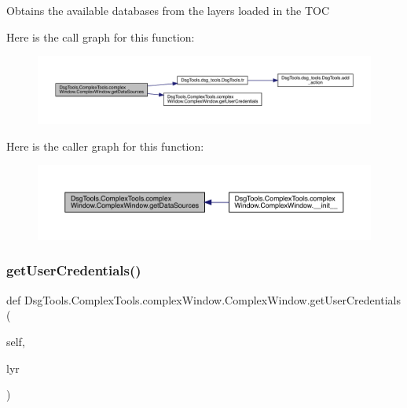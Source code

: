 \begin{DoxyVerb}Obtains the available databases from the layers loaded in the TOC
\end{DoxyVerb}
 Here is the call graph for this function\+:
\nopagebreak
\begin{figure}[H]
\begin{center}
\leavevmode
\includegraphics[width=350pt]{class_dsg_tools_1_1_complex_tools_1_1complex_window_1_1_complex_window_a4342f9df9ceb2b074509474ce8fa32d0_cgraph}
\end{center}
\end{figure}
Here is the caller graph for this function\+:
\nopagebreak
\begin{figure}[H]
\begin{center}
\leavevmode
\includegraphics[width=350pt]{class_dsg_tools_1_1_complex_tools_1_1complex_window_1_1_complex_window_a4342f9df9ceb2b074509474ce8fa32d0_icgraph}
\end{center}
\end{figure}
\mbox{\label{class_dsg_tools_1_1_complex_tools_1_1complex_window_1_1_complex_window_a14d77bda16484cd0b5c53c23f44c4a2d}} 
\subsubsection{\texorpdfstring{get\+User\+Credentials()}{getUserCredentials()}}
{\footnotesize\ttfamily def Dsg\+Tools.\+Complex\+Tools.\+complex\+Window.\+Complex\+Window.\+get\+User\+Credentials (\begin{DoxyParamCaption}\item[{}]{self,  }\item[{}]{lyr }\end{DoxyParamCaption})}

